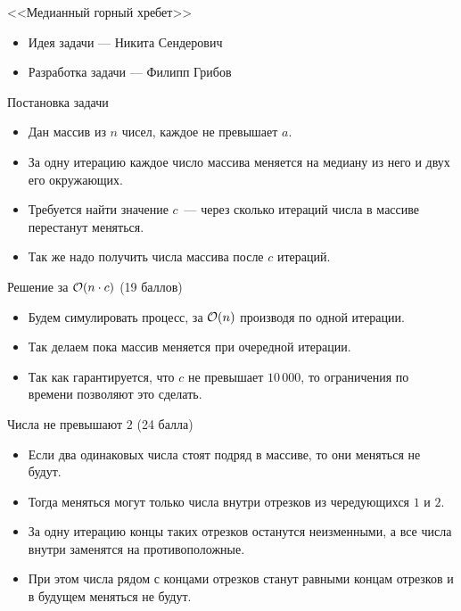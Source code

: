 \begin{frame}
  \begin{center}
    \LARGE <<Медианный горный хребет>>
  \end{center}

  \begin{itemize}
  \item Идея задачи --- Никита Сендерович
  \item Разработка задачи --- Филипп Грибов
  \end{itemize}

\end{frame}

\begin{frame}{Постановка задачи}

  \begin{itemize}
  \item Дан массив из $n$ чисел, каждое не превышает $a$.
  \item За одну итерацию каждое число массива меняется на медиану из него и двух его окружающих.
  \item Требуется найти значение $c$~--- через сколько итераций числа в массиве перестанут меняться.
  \item Так же надо получить числа массива после $c$ итераций.
  \end{itemize}
  
\end{frame}

\begin{frame}{Решение за $\mathcal{O}(n \cdot c)$ (19 баллов)}
  \begin{itemize}
  \item Будем симулировать процесс, за $\mathcal{O}(n)$ производя по одной итерации.
  \item Так делаем пока массив меняется при очередной итерации.
  \item Так как гарантируется, что $c$ не превышает $10\,000$, то ограничения по времени позволяют это сделать.
  \end{itemize}
\end{frame}

\begin{frame}{Числа не превышают $2$ (24 балла)}
  \begin{itemize}
  \item Если два одинаковых числа стоят подряд в массиве, то они меняться не будут.
  \item Тогда меняться могут только числа внутри отрезков из чередующихся $1$ и $2$.
  \item За одну итерацию концы таких отрезков останутся неизменными, а все числа внутри заменятся на противоположные.
  \item При этом числа рядом с концами отрезков станут равными концам отрезков и в будущем меняться не будут.
  \end{itemize}
\end{frame}

